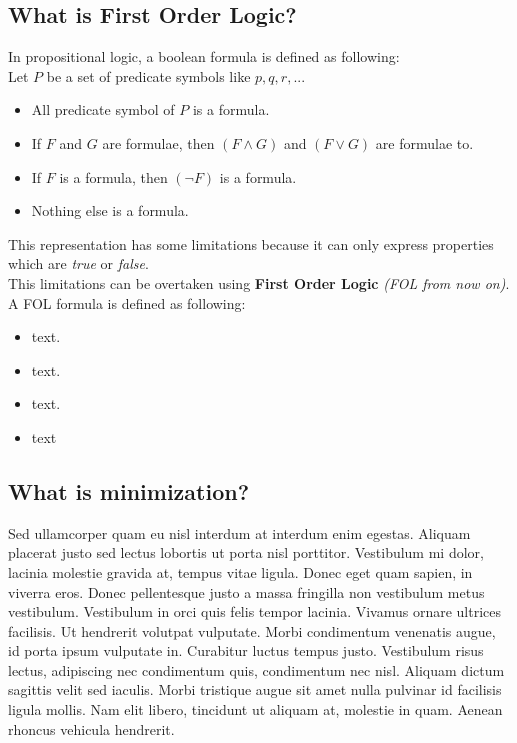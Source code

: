 \subsection{What is First Order Logic?}
In propositional logic, a boolean formula is defined as following\cite{Lpo}:\\
Let $P$ be a set of predicate symbols like $p,q,r,...$
\begin{itemize}
	\item All predicate symbol of $P$ is a formula.
	\item If $F$ and $G$ are formulae, then $(F \land G)$ and $(F \lor G)$ are formulae to.
	\item If $F$ is a formula, then $(\neg F)$ is a formula.
	\item Nothing else is a formula.
\end{itemize}
This representation has some limitations because it can only express properties which are \emph{true} or \emph{false}.\\
This limitations can be overtaken using \textbf{First Order Logic} \textit{(FOL from now on)}. A FOL formula is defined as following\cite{Fol}:\\
\begin{itemize}
	\item text.
	\item text.
	\item text.
	\item text
\end{itemize}


\subsection{What is minimization?}

Sed ullamcorper quam eu nisl interdum at interdum enim egestas. Aliquam placerat justo sed lectus lobortis ut porta nisl porttitor. Vestibulum mi dolor, lacinia molestie gravida at, tempus vitae ligula. Donec eget quam sapien, in viverra eros. Donec pellentesque justo a massa fringilla non vestibulum metus vestibulum. Vestibulum in orci quis felis tempor lacinia. Vivamus ornare ultrices facilisis. Ut hendrerit volutpat vulputate. Morbi condimentum venenatis augue, id porta ipsum vulputate in. Curabitur luctus tempus justo. Vestibulum risus lectus, adipiscing nec condimentum quis, condimentum nec nisl. Aliquam dictum sagittis velit sed iaculis. Morbi tristique augue sit amet nulla pulvinar id facilisis ligula mollis. Nam elit libero, tincidunt ut aliquam at, molestie in quam. Aenean rhoncus vehicula hendrerit.